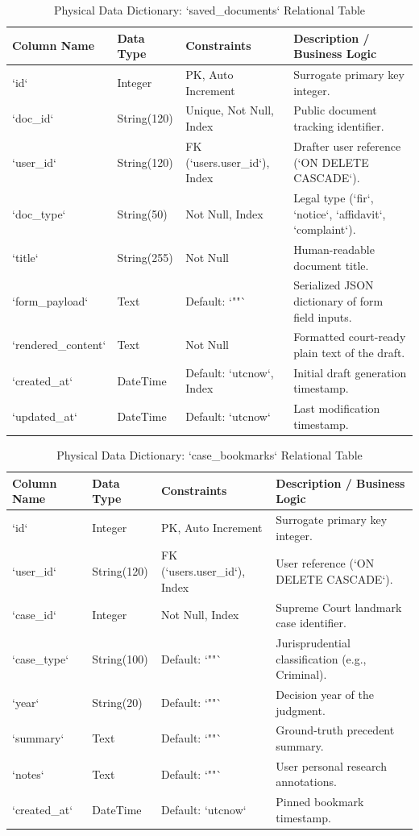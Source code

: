 \begin{table}[H]
\caption{Physical Data Dictionary: `saved_documents` Relational Table}
\label{tab:schema_documents}
\centering
\small
\begin{tabularx}{\textwidth}{lp{2.8cm}p{2.5cm}X}
\toprule
\textbf{Column Name} & \textbf{Data Type} & \textbf{Constraints} & \textbf{Description / Business Logic} \\
\midrule
`id` & Integer & PK, Auto Increment & Surrogate primary key integer. \\
`doc_id` & String(120) & Unique, Not Null, Index & Public document tracking identifier. \\
`user_id` & String(120) & FK (`users.user_id`), Index & Drafter user reference (`ON DELETE CASCADE`). \\
`doc_type` & String(50) & Not Null, Index & Legal type (`fir`, `notice`, `affidavit`, `complaint`). \\
`title` & String(255) & Not Null & Human-readable document title. \\
`form_payload` & Text & Default: `"{}"` & Serialized JSON dictionary of form field inputs. \\
`rendered_content`& Text & Not Null & Formatted court-ready plain text of the draft. \\
`created_at` & DateTime & Default: `utcnow`, Index & Initial draft generation timestamp. \\
`updated_at` & DateTime & Default: `utcnow` & Last modification timestamp. \\
\bottomrule
\end{tabularx}
\end{table}

\begin{table}[H]
\caption{Physical Data Dictionary: `case_bookmarks` Relational Table}
\label{tab:schema_bookmarks}
\centering
\small
\begin{tabularx}{\textwidth}{lp{2.8cm}p{2.5cm}X}
\toprule
\textbf{Column Name} & \textbf{Data Type} & \textbf{Constraints} & \textbf{Description / Business Logic} \\
\midrule
`id` & Integer & PK, Auto Increment & Surrogate primary key integer. \\
`user_id` & String(120) & FK (`users.user_id`), Index & User reference (`ON DELETE CASCADE`). \\
`case_id` & Integer & Not Null, Index & Supreme Court landmark case identifier. \\
`case_type` & String(100) & Default: `""` & Jurisprudential classification (e.g., Criminal). \\
`year` & String(20) & Default: `""` & Decision year of the judgment. \\
`summary` & Text & Default: `""` & Ground-truth precedent summary. \\
`notes` & Text & Default: `""` & User personal research annotations. \\
`created_at` & DateTime & Default: `utcnow` & Pinned bookmark timestamp. \\
\bottomrule
\end{tabularx}
\end{table}

